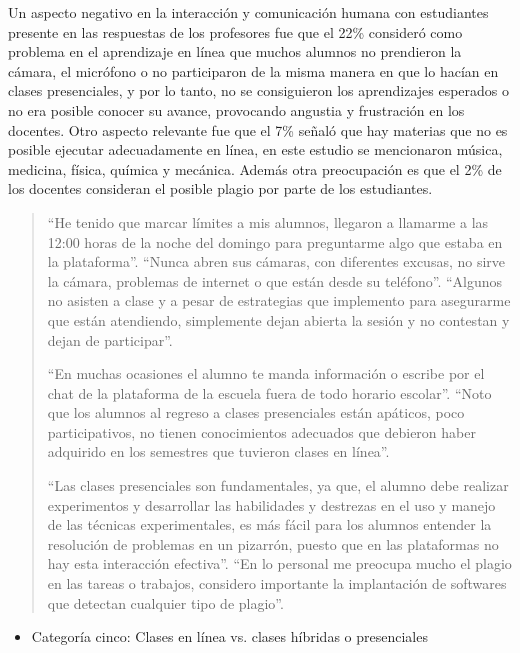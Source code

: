\documentclass[spanish]{textolivre}
\begin{document}
Un aspecto negativo en la interacción y comunicación humana con estudiantes presente en las respuestas de los profesores fue que el 22\% consideró como problema en el aprendizaje en línea que muchos alumnos no prendieron la cámara, el micrófono o no participaron de la misma manera en que lo hacían en clases presenciales, y por lo tanto, no se consiguieron los aprendizajes esperados o no era posible conocer su avance, provocando angustia y frustración en los docentes. Otro aspecto relevante fue que el 7\% señaló que hay materias que no es posible ejecutar adecuadamente en línea, en este estudio se mencionaron música, medicina, física, química y mecánica. Además otra preocupación es que el 2\% de los docentes consideran el posible plagio por parte de los estudiantes.
\begin{quote}
 “He tenido que marcar límites a mis alumnos, llegaron a llamarme a las 12:00 horas de la noche del domingo para preguntarme algo que estaba en la plataforma”. “Nunca abren sus cámaras, con diferentes excusas, no sirve la cámara, problemas de internet o que están desde su teléfono”. “Algunos no asisten a clase y a pesar de estrategias que implemento para asegurarme que están atendiendo, simplemente dejan abierta la sesión y no contestan y dejan de participar”.
 
“En muchas ocasiones el alumno te manda información o escribe por el chat de la plataforma de la escuela fuera de todo horario escolar”. “Noto que los alumnos al regreso a clases presenciales están apáticos, poco participativos, no tienen conocimientos adecuados que debieron haber adquirido en los semestres que tuvieron clases en línea”. 

“Las clases presenciales son fundamentales, ya que, el alumno debe realizar experimentos y desarrollar las habilidades y destrezas en el uso y manejo de las técnicas experimentales, es más fácil para los alumnos entender la resolución de problemas en un pizarrón, puesto que en las plataformas no hay esta interacción efectiva”. “En lo personal me preocupa mucho el plagio en las tareas o trabajos, considero importante la implantación de softwares que detectan cualquier tipo de plagio”.
\end{quote}

\begin{itemize}
 \item Categoría cinco: Clases en línea vs. clases híbridas o presenciales
\end{itemize}
\end{document}
